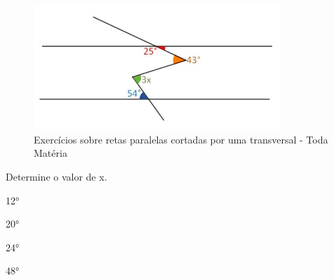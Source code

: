 \begin{escolha}
\begin{boxmedio}
\begin{boxmedio}
{\begin{boxpeq}
\begin{boxpeq}
{\begin{boxpeq}
\begin{boxmedio}
\begin{boxmedio}
\begin{boxpeq}
\begin{boxmedio}
\begin{boxpeq}
\begin{boxpeq}
\begin{boxpeq}
\begin{boxpeq}
\begin{boxmedio}
{\begin{boxmedio}
\begin{boxmedio}
\begin{boxpeq}
\begin{boxmedio}
\begin{boxpeq}
\begin{boxpeq}
\begin{boxpeq}
\begin{escolha}
{\begin{boxmedio}
\begin{boxpeq}
\begin{boxpeq}
\begin{boxpeq}
\begin{boxpeq}
\begin{boxpeq}
\begin{boxmedio}
\begin{boxpeq}
\begin{boxpeq}
\begin{boxpeq}
{\begin{boxpeq}
\begin{boxmedio}
\begin{boxpeq}
\begin{boxpeq}
\begin{boxpeq}
{\begin{boxpeq}
\begin{boxmedio}
{\begin{boxpeq}
\begin{boxpeq}
\begin{boxmedio}
\begin{boxmedio}
\begin{boxpeq}
\begin{boxpeq}
{\begin{boxpeq}
\begin{boxpeq}
\begin{boxpeq}
\begin{boxpeq}
\begin{boxpeq}
\begin{escolha}
\begin{escolha}
{\begin{boxmedio}
\begin{boxpeq}
\begin{q°}
\begin{boxmedio}
\begin{boxpeq}
\begin{boxpeq}
\begin{boxmedio}
\begin{boxmedio}
\begin{boxmedio}
\begin{figure}
\centering
\includegraphics[width=3.65833in,height=1.84637in]{./_SAEB_9_MAT/media/image194.jpeg}
\caption{Exercícios sobre retas paralelas cortadas por uma transversal -
Toda Matéria}
\end{figure}


Determine o valor de x.

\begin{escolha}

  \item 12°

  \item 20°

  \item 24°

  \item 48°

\end{escolha}


\end{boxmedio}
\end{boxmedio}
\end{boxmedio}
\end{boxpeq}
\end{boxpeq}
\end{boxmedio}
\end{q°}
\end{boxpeq}
\end{boxmedio}}
\end{escolha}
\end{escolha}
\end{boxpeq}
\end{boxpeq}
\end{boxpeq}
\end{boxpeq}
\end{boxpeq}}
\end{boxpeq}
\end{boxpeq}
\end{boxmedio}
\end{boxmedio}
\end{boxpeq}
\end{boxpeq}}
\end{boxmedio}
\end{boxpeq}}
\end{boxpeq}
\end{boxpeq}
\end{boxpeq}
\end{boxmedio}
\end{boxpeq}}
\end{boxpeq}
\end{boxpeq}
\end{boxpeq}
\end{boxmedio}
\end{boxpeq}
\end{boxpeq}
\end{boxpeq}
\end{boxpeq}
\end{boxpeq}
\end{boxmedio}}
\end{escolha}
\end{boxpeq}
\end{boxpeq}
\end{boxpeq}
\end{boxmedio}
\end{boxpeq}
\end{boxmedio}
\end{boxmedio}}
\end{boxmedio}
\end{boxpeq}
\end{boxpeq}
\end{boxpeq}
\end{boxpeq}
\end{boxmedio}
\end{boxpeq}
\end{boxmedio}
\end{boxmedio}
\end{boxpeq}}
\end{boxpeq}
\end{boxpeq}}
\end{boxmedio}
\end{boxmedio}
\end{escolha}
